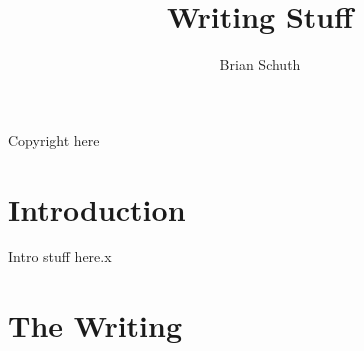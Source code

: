 \documentclass[draft,10pt,openany,800paper]{kdp}  %
\title{Writing Stuff}
\author{Brian Schuth}
\begin{document}
\frontmatter
Copyright here

\tableofcontents

\mainmatter
\part{Introduction}

Intro stuff here.x

\part{The Writing}














\end{document}
